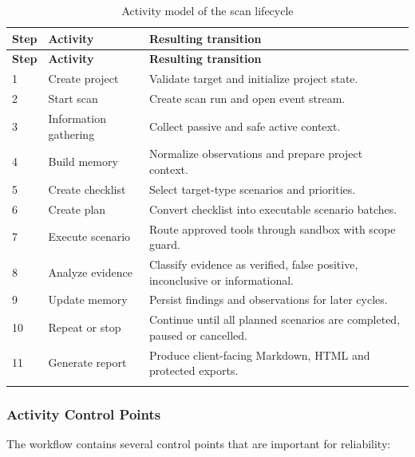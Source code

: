 \documentclass[12pt,a4paper]{report}
\begin{document}
\begin{longtable}{|p{}|p{}|p{}|}
\hline
\textbf{Step} & \textbf{Activity} & \textbf{Resulting transition} \\
\hline
\endfirsthead
\hline
\textbf{Step} & \textbf{Activity} & \textbf{Resulting transition} \\
\hline
\endhead
1 & Create project & Validate target and initialize project state. \\
\hline
2 & Start scan & Create scan run and open event stream. \\
\hline
3 & Information gathering & Collect passive and safe active context. \\
\hline
4 & Build memory & Normalize observations and prepare project context. \\
\hline
5 & Create checklist & Select target-type scenarios and priorities. \\
\hline
6 & Create plan & Convert checklist into executable scenario batches. \\
\hline
7 & Execute scenario & Route approved tools through sandbox with scope guard. \\
\hline
8 & Analyze evidence & Classify evidence as verified, false positive, inconclusive or informational. \\
\hline
9 & Update memory & Persist findings and observations for later cycles. \\
\hline
10 & Repeat or stop & Continue until all planned scenarios are completed, paused or cancelled. \\
\hline
11 & Generate report & Produce client-facing Markdown, HTML and protected exports. \\
\hline
\caption{Activity model of the scan lifecycle}
\label{tab:activity_scan}
\end{longtable}

\subsubsection{Activity Control Points}

The workflow contains several control points that are important for reliability:
\end{document}
